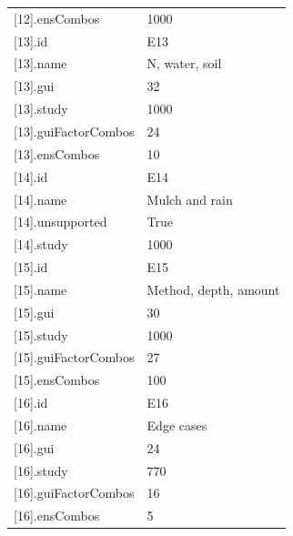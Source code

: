 {\begin{longtable}{p{}p{}}
{}[12].ensCombos & 1000\\
{}[13].id & E13\\
{}[13].name & N, water, soil\\
{}[13].gui & 32\\
{}[13].study & 1000\\
{}[13].guiFactorCombos & 24\\
{}[13].ensCombos & 10\\
{}[14].id & E14\\
{}[14].name & Mulch and rain\\
{}[14].unsupported & True\\
{}[14].study & 1000\\
{}[15].id & E15\\
{}[15].name & Method, depth, amount\\
{}[15].gui & 30\\
{}[15].study & 1000\\
{}[15].guiFactorCombos & 27\\
{}[15].ensCombos & 100\\
{}[16].id & E16\\
{}[16].name & Edge cases\\
{}[16].gui & 24\\
{}[16].study & 770\\
{}[16].guiFactorCombos & 16\\
{}[16].ensCombos & 5\\
\bottomrule\end{longtable}}

